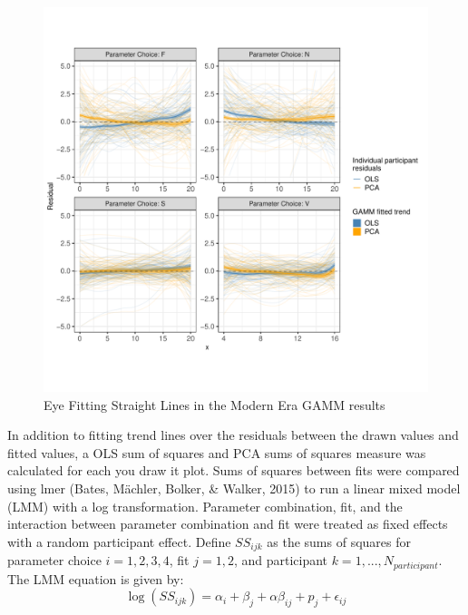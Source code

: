 \documentclass[print]{nuthesis}
\begin{document}
\begin{figure}[tbp]

{\centering \includegraphics[width=1\linewidth,]{thesis_files/figure-latex/eyefitting-gamm-residualplots-1} 

}

\caption{Eye Fitting Straight Lines in the Modern Era GAMM results}\label{fig:eyefitting-gamm-residualplots}
\end{figure}

In addition to fitting trend lines over the residuals between the drawn values and fitted values, a OLS sum of squares and PCA sums of squares measure was calculated for each you draw it plot.
Sums of squares between fits were compared using lmer (Bates, Mächler, Bolker, \& Walker, 2015) to run a linear mixed model (LMM) with a log transformation.
Parameter combination, fit, and the interaction between parameter combination and fit were treated as fixed effects with a random participant effect.
Define \(SS_{ijk}\) as the sums of squares for parameter choice \(i = 1,2,3,4\), fit \(j=1,2\), and participant \(k = 1,...,N_{participant}\).
The LMM equation is given by:
\begin{equation}
\log\left(SS_{ijk}\right) = \alpha_i + \beta_j + \alpha\beta_{ij} + p_{j} + \epsilon_{ij}
\end{equation}
\end{document}
